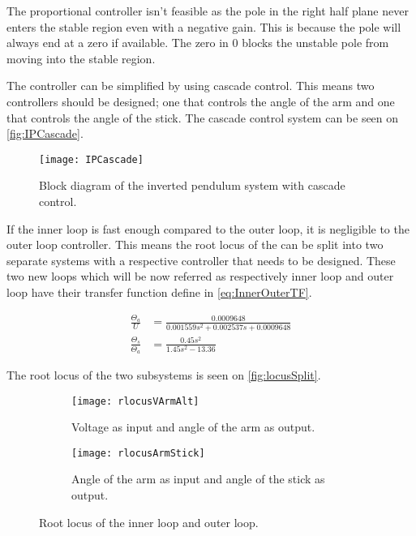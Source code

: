 The proportional controller isn't feasible as the pole in the right half plane never enters the stable region even with a negative gain. This is because the pole will always end at a zero if available. The zero in 0 blocks the unstable pole from moving into the stable region.

The controller can be simplified by using cascade control. This means two controllers should be designed; one that controls the angle of the arm and one that controls the angle of the stick. The cascade control system can be seen on \autoref{fig:IPCascade}.

\begin{figure}[htbp]
\centering
\texttt{[image: IPCascade]}
\caption{Block diagram of the inverted pendulum system with cascade control.}
\label{fig:IPCascade}
\end{figure}

If the inner loop is fast enough compared to the outer loop, it is negligible to the outer loop controller. This means the root locus of the can be split into two separate systems with a respective controller that needs to be designed. These two new loops which will be now referred as respectively inner loop and outer loop have their transfer function define in \autoref{eq:InnerOuterTF}.

\begin{subequations}\label{eq:InnerOuterTF}
	\begin{flalign}
		\frac{\Theta_a}{U}&= \frac{0.0009648}{0.001559 s^2 + 0.002537 s + 0.0009648}\\
		\frac{\Theta_s}{\Theta_a}&=\frac{0.45 s^2}{1.45 s^2 - 13.36}
	\end{flalign}
\end{subequations}

The root locus of the two subsystems is seen on \autoref{fig:locusSplit}.
\begin{figure}[htbp]
\centering
	\begin{subfigure}{0.45\textwidth}
	\texttt{[image: rlocusVArmAlt]}
	\caption{Voltage as input and angle of the arm as output.}
	\label{fig:locusVArm}
	\end{subfigure}
	\begin{subfigure}{0.45\textwidth}
	\texttt{[image: rlocusArmStick]}
	\caption{Angle of the arm as input and angle of the stick as output.}
	\end{subfigure}
\caption{Root locus of the inner loop and outer loop.}
\label{fig:locusSplit}
\end{figure}

